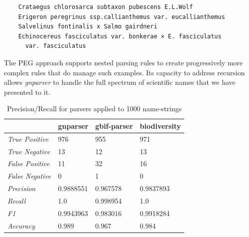 \documentclass{bmcart}
\begin{document}
\vspace{0.5cm}

\begin{verbatim}
    Crataegus chlorosarca subtaxon pubescens E.L.Wolf
    Erigeron peregrinus ssp.callianthemus var. eucallianthemus
    Salvelinus fontinalis x Salmo gairdneri
    Echinocereus fasciculatus var. bonkerae × E. fasciculatus
      var. fasciculatus
\end{verbatim}

\vspace{0.5cm}

The PEG approach supports nested parsing rules to create progressively more complex rules that do manage such examples. Its capacity to address
recursion allows \textit{gnparser} to handle the full spectrum of scientific names that we have presented to it.

\begin{table}[htb]
  \begin{center}
    \caption{Precision/Recall for parsers applied to 1000
    name-strings}\label{table:precision}
    \resizebox{10cm}{!} {
    \begin{tabular}{|l|*{3}{l}|}
      \hline
                             & gnparser & gbif-parser & biodiversity \\
      \hline
      \textit{True Positive} & 976      & 955         & 971          \\
      \textit{True Negative} & 13       & 12          & 13           \\
      \textit{False Positive}& 11       & 32          & 16           \\
      \textit{False Negative}& 0        & 1           & 0            \\
      \textit{Precision}     & 0.9888551& 0.967578    & 0.9837893    \\
      \textit{Recall}        & 1.0      & 0.998954    & 1.0          \\
      \textit{F1}            & 0.9943963& 0.983016    & 0.9918284    \\
      \textit{Accuracy}      & 0.989    & 0.967       & 0.984        \\
      \hline
    \end{tabular}
    }
  \end{center}
\end{table}
\end{document}

